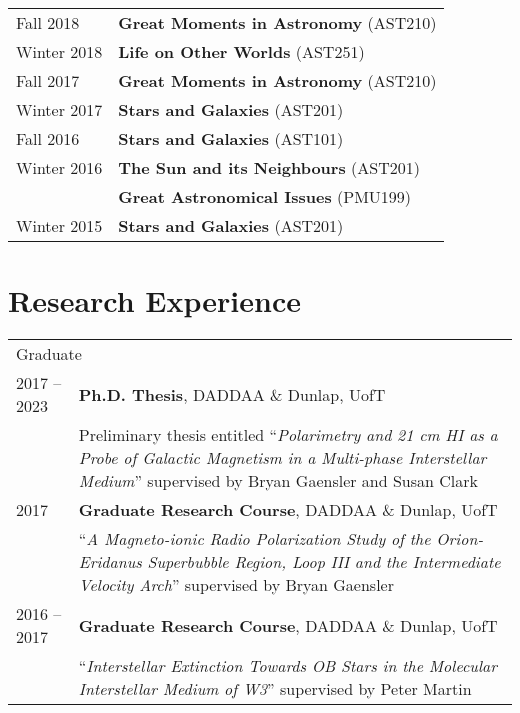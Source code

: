\documentclass[10pt]{res} %
\begin{document}
\begin{resume}
\begin{table}[h!]
\begin{tabularx}{\textwidth}{ @{} p{6.5em} X @{} }
Fall 2018         & \textbf{Great Moments in Astronomy} (AST210) \\
Winter 2018    & \textbf{Life on Other Worlds} (AST251) \\
Fall 2017         & \textbf{Great Moments in Astronomy} (AST210) \\
Winter 2017    & \textbf{Stars and Galaxies} (AST201) \\
Fall 2016         & \textbf{Stars and Galaxies} (AST101) \\
Winter 2016    & \textbf{The Sun and its Neighbours} (AST201) \\
                        & \textbf{Great Astronomical Issues} (PMU199) \\
Winter 2015    & \textbf{Stars and Galaxies} (AST201)
\end{tabularx}
\end{table}


\section{\Large Research Experience}
\vspace{-5pt} %
\noindent\makebox[\linewidth]{\rule{\textwidth}{0.4pt}}
\vspace{-20pt} %

\begin{table}[h!]
\begin{tabularx}{\textwidth}{ @{} p{6.5em} X @{} }
\multicolumn{2}{l}{ \rule{0pt}{3ex} \large \hspace{-12pt} Graduate \dotfill \rule[-1.2ex]{0pt}{0pt}} \\
2017 -- 2023 & \textbf{Ph.D. Thesis}, DADDAA \& Dunlap, UofT \\
                     & Preliminary thesis entitled ``\textit{Polarimetry and 21 cm HI as a Probe of Galactic Magnetism in a Multi-phase Interstellar Medium}'' supervised by Bryan Gaensler and Susan Clark \\
2017 & \textbf{Graduate Research Course}, DADDAA \& Dunlap, UofT \\
         & ``\textit{A Magneto-ionic Radio Polarization Study of the Orion-Eridanus Superbubble Region, Loop III and the Intermediate Velocity Arch}'' supervised by Bryan Gaensler \\
2016 -- 2017 & \textbf{Graduate Research Course}, DADDAA \& Dunlap, UofT  \\
                     & ``\textit{Interstellar Extinction Towards OB Stars in the Molecular Interstellar Medium of W3}'' supervised by Peter Martin
\end{tabularx}
\end{table}


\end{resume}
\end{document}
